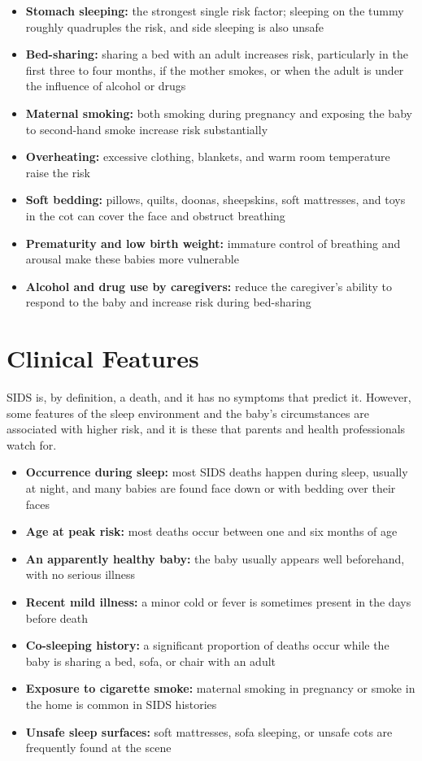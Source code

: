 \begin{itemize}
    \item \textbf{Stomach sleeping:} the strongest single risk factor; sleeping on the tummy roughly quadruples the risk, and side sleeping is also unsafe
    \item \textbf{Bed-sharing:} sharing a bed with an adult increases risk, particularly in the first three to four months, if the mother smokes, or when the adult is under the influence of alcohol or drugs
    \item \textbf{Maternal smoking:} both smoking during pregnancy and exposing the baby to second-hand smoke increase risk substantially
    \item \textbf{Overheating:} excessive clothing, blankets, and warm room temperature raise the risk
    \item \textbf{Soft bedding:} pillows, quilts, doonas, sheepskins, soft mattresses, and toys in the cot can cover the face and obstruct breathing
    \item \textbf{Prematurity and low birth weight:} immature control of breathing and arousal make these babies more vulnerable
    \item \textbf{Alcohol and drug use by caregivers:} reduce the caregiver's ability to respond to the baby and increase risk during bed-sharing
\end{itemize}

\section*{Clinical Features}
SIDS is, by definition, a death, and it has no symptoms that predict it. However, some features of the sleep environment and the baby's circumstances are associated with higher risk, and it is these that parents and health professionals watch for.

\begin{itemize}
    \item \textbf{Occurrence during sleep:} most SIDS deaths happen during sleep, usually at night, and many babies are found face down or with bedding over their faces
    \item \textbf{Age at peak risk:} most deaths occur between one and six months of age
    \item \textbf{An apparently healthy baby:} the baby usually appears well beforehand, with no serious illness
    \item \textbf{Recent mild illness:} a minor cold or fever is sometimes present in the days before death
    \item \textbf{Co-sleeping history:} a significant proportion of deaths occur while the baby is sharing a bed, sofa, or chair with an adult
    \item \textbf{Exposure to cigarette smoke:} maternal smoking in pregnancy or smoke in the home is common in SIDS histories
    \item \textbf{Unsafe sleep surfaces:} soft mattresses, sofa sleeping, or unsafe cots are frequently found at the scene
\end{itemize}

